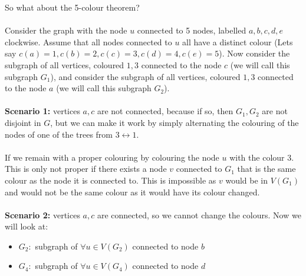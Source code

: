 \documentclass[12pt]{article}
\begin{document}
So what about the 5-colour theorem?\\
\\
Consider the graph with the node $u$ connected to 5 nodes, labelled $a,b,c,d,e$ clockwise. Assume that all nodes connected to $u$ all have a distinct colour (Lets say $c(a)=1, c(b)=2, c(c)=3, c(d)=4, c(e)=5$). Now consider the subgraph of all vertices, coloured $1,3$ connected to the node $c$ (we will call this subgraph $G_1$), and consider the subgraph of all vertices, coloured $1,3$ connected to the node $a$ (we will call this subgraph $G_2$).\\
\\
\textbf{Scenario 1:} vertices $a,c$ are not connected, because if so, then $G_1, G_2$ are not disjoint in $G$, but we can make it work by simply alternating the colouring of the nodes of one of the trees from $3 \leftrightarrow 1$.\\
\\
If we remain with a proper colouring by colouring the node $u$ with the colour 3. This is only not proper if there exists a node $v$ connected to $G_1$ that is the same colour as the node it is connected to. This is impossible as $v$ would be in $V(G_1)$ and would not be the same colour as it would have its colour changed.\\
\\
\textbf{Scenario 2:} vertices $a,c$ are connected, so we cannot change the colours. Now we will look at:
\begin{itemize}
	\item{$G_2 : $ subgraph of $\forall u \in V(G_2)$ connected to node $b$}
	\item{$G_4 : $ subgraph of $\forall u \in V(G_4)$ connected to node $d$}
\end{itemize}
\end{document}
